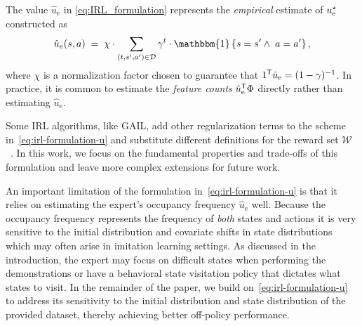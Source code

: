 \documentclass[10pt]{article}
\renewcommand{\cite}{\citep}
\theoremstyle{plain}
\theoremstyle{remark}
\begin{document}
The value $\hat{u}_{\mathrm{e}}$ in \eqref{eq:IRL_formulation} represents the \emph{empirical} estimate of $u_{\mathrm{e}}^{\mathnormal{\star}}$ constructed as
\begin{equation} \label{eq:definition_u_hat}
  \hat{u}_e(s,a)
  \;=\; \chi \cdot \sum_{(t, s',a') \in \mathcal{D}} \gamma^t \cdot  \mathbbm{1}\left\{s=s' \wedge\; a=a'\right\},
\end{equation}
where $\chi$ is a normalization factor chosen to guarantee that $1^{\mathsf{T}} \hat{u}_{\mathrm{e}} = (1-\gamma)^{-1}$. In practice, it is common to estimate the \emph{feature counts} $\hat{u}_{\mathrm{e}}^{\mathsf{T}} \Phi$ directly rather than estimating $\hat{u}_{\mathrm{e}}$.

Some IRL algorithms, like GAIL, add other regularization terms to the scheme in~\eqref{eq:irl-formulation-u} and substitute different definitions for the reward set $\mathcal{W}$~\cite{Ho2016}. In this work, we focus on the fundamental properties and trade-offs of this formulation and leave more complex extensions for future work.

An important limitation of the formulation in~\eqref{eq:irl-formulation-u} is that it relies on estimating the expert's occupancy frequency $\hat{u}_{\mathrm{e}}$ well. Because the occupancy frequency represents the frequency of \emph{both} states and actions it is very sensitive to the initial distribution and covariate shifts in state distributions which may often arise in imitation learning settings. As discussed in the introduction, the expert may focus on difficult states when performing the demonstrations or have a behavioral state visitation policy that dictates what states to visit. In the remainder of the paper, we build on~\eqref{eq:irl-formulation-u} to address its sensitivity to the initial distribution and state distribution of the provided dataset, thereby achieving better off-policy performance. 



\end{document}

